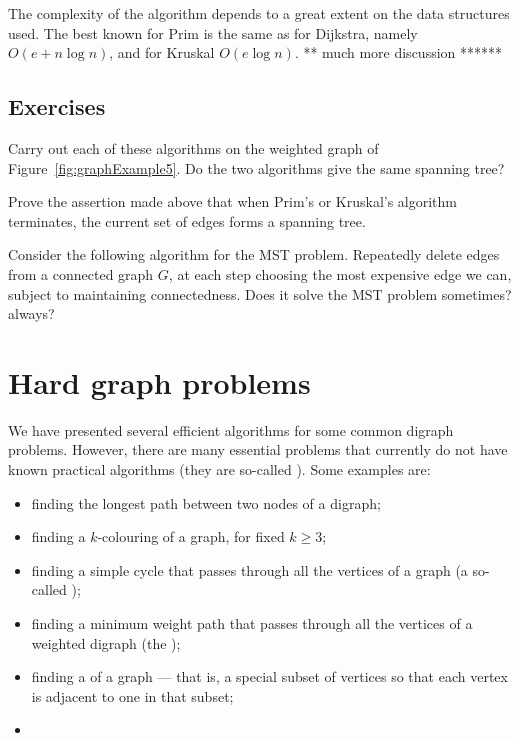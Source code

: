 The complexity of the algorithm depends to a great extent on the data
structures used. The best known for Prim is the same as for Dijkstra,
namely $O(e + n\log n)$, and for Kruskal $O(e \log n)$. ** much more
discussion ******


\subsection*{Exercises}


\begin{Exercise} \label{ex:doMST}
Carry out each of these algorithms on the weighted
graph of Figure~\ref{fig:graphExample5}. Do the two algorithms give the
same spanning tree? 
\end{Exercise}

\begin{Exercise} \label{ex:spanning-tree}
Prove the assertion made above that when  Prim's or Kruskal's algorithm 
terminates, the current set of edges forms a spanning tree.
\end{Exercise}

\begin{Exercise}\label{ex:silly-MST}
Consider the following algorithm for the MST problem. Repeatedly delete
edges from a connected graph $G$, at each step choosing the most
expensive edge we can, subject to maintaining connectedness. Does it
solve the MST problem sometimes? always?

\end{Exercise}

\section{Hard graph problems}
\label{sec:hardgraph}
We have presented several efficient algorithms
for some common digraph problems.  However, there are many essential 
problems that currently do not have known practical algorithms (they
are so-called ). Some examples
are:
\begin{itemize}
\item finding the longest path between two nodes of
a digraph;
\item finding a $k$-colouring of a graph, for fixed $k\geq
3$;\item finding a simple cycle that passes through all the vertices of
a graph (a so-called );
\item finding a
minimum weight path that passes through all the vertices of a weighted
digraph (the );
\item finding a
 of a graph --- that is, a special subset of
vertices so that each vertex is adjacent to one in that
subset;
\item
\end{itemize}

